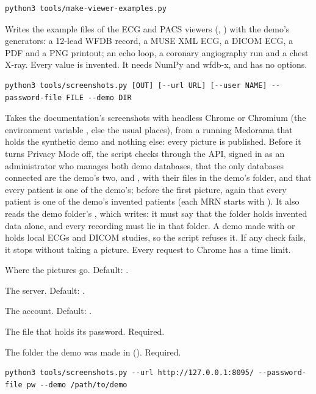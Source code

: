 \begin{lstlisting}[style=signature]
python3 tools/make-viewer-examples.py
\end{lstlisting}
Writes the example files of the ECG and PACS viewers (,
) with the demo's generators: a 12-lead WFDB record, a MUSE XML ECG,
a DICOM ECG, a PDF and a PNG printout; an echo loop, a coronary angiography run and a chest X-ray.
Every value is invented. It needs NumPy and wfdb-x, and has no options.

\begin{lstlisting}[style=signature]
python3 tools/screenshots.py [OUT] [--url URL] [--user NAME] --password-file FILE --demo DIR
\end{lstlisting}
Takes the documentation's screenshots with headless Chrome or Chromium (the environment variable
, else the usual places), from a running Medorama that holds the
synthetic demo and nothing else: every picture is published. Before it turns Privacy Mode off,
the script checks through the API, signed in as an administrator who manages both demo
databases, that the only databases connected are the demo's two,  and
, with their files in the demo's folder, and that every patient is one of the
demo's; before the first picture, again that every patient is one of the demo's invented
patients (each MRN starts with ). It also reads the demo folder's ,
which  writes: it must say that the folder holds invented data alone,
and every recording must lie in that folder. A demo made
with  or  holds local ECGs and DICOM studies, so the script
refuses it. If any check fails, it stops without taking a picture. Every request to Chrome has
a time limit.
\begin{params}
\item[OUT] Where the pictures go. Default: .
\item[--url URL] The server. Default: .
\item[--user NAME] The account. Default: .
\item[--password-file FILE] The file that holds its password. Required.
\item[--demo DIR] The folder the demo was made in ().
  Required.
\end{params}
\begin{lstlisting}[style=shell]
python3 tools/screenshots.py --url http://127.0.0.1:8095/ --password-file pw --demo /path/to/demo
\end{lstlisting}

